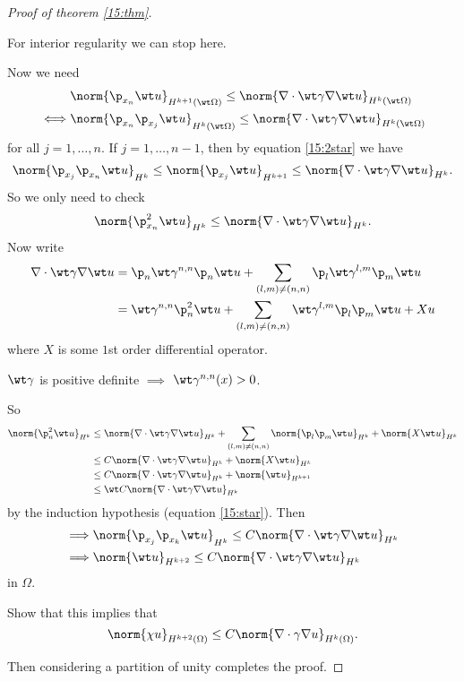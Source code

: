 \begin{proof}[Proof of theorem \ref{15:thm}]
  \begin{rmk}
    For interior regularity we can stop here.
  \end{rmk}

  Now we need
  \begin{align*}
    &\norm{\p_{x_n}\wt u}_{H^{k+1}(\wt\Omega)} \leq \norm{\nabla\cdot\wt\gamma\nabla\wt u}_{H^k(\wt\Omega)} \\
    \iff &\norm{\p_{x_n}\p_{x_j}\wt u}_{H^k(\wt\Omega)} \leq \norm{\nabla\cdot\wt\gamma\nabla\wt u}_{H^k(\wt\Omega)}
  \end{align*}
  for all $j=1,\ldots,n$.
  If $j=1,\ldots,n-1$, then by equation \ref{15:2star} we have
  \[ \norm{\p_{x_j}\p_{x_n}\wt u}_{H^k} \leq \norm{\p_{x_j}\wt u}_{H^{k+1}} \leq \norm{\nabla\cdot\wt\gamma\nabla\wt u}_{H^k}. \]
  So we only need to check
  \[ \norm{\p_{x_n}^2\wt u}_{H^k} \leq \norm{\nabla\cdot\wt\gamma\nabla\wt u}_{H^k}. \]
  Now write
  \begin{align*}
    \nabla\cdot\wt\gamma\nabla\wt u &= \p_n \wt\gamma^{n,n} \p_n \wt u + \sum_{(l,m)\neq(n,n)} \p_l \wt\gamma^{l,m} \p_m \wt u \\
    &= \wt\gamma^{n,n} \p_n^2 \wt u + \sum_{(l,m)\neq(n,n)} \wt\gamma^{l,m} \p_l\p_m \wt u + Xu
  \end{align*}
  where $X$ is some $1$st order differential operator.

  \begin{exer}
    $\wt\gamma$ is positive definite $\implies$ $\wt\gamma^{n,n}(x)>0$.
  \end{exer}

  So
  \begin{align*}
    \norm{\p_n^2\wt u}_{H^k} &\leq \norm{\nabla\cdot\wt\gamma\nabla\wt u}_{H^k} + \sum_{(l,m)\neq(n,n)} \norm{\p_l\p_m\wt u}_{H^k} + \norm{X\wt u}_{H^k} \\
    &\leq C\norm{\nabla\cdot\wt\gamma\nabla\wt u}_{H^k} + \norm{X\wt u}_{H^k} \\
    &\leq C\norm{\nabla\cdot\wt\gamma\nabla\wt u}_{H^k} + \norm{\wt u}_{H^{k+1}} \\
    &\leq \wt C\norm{\nabla\cdot\wt\gamma\nabla\wt u}_{H^k}
  \end{align*}
  by the induction hypothesis (equation \ref{15:star}).
  Then
  \begin{align*}
    \implies &\norm{\p_{x_j}\p_{x_k}\wt u}_{H^k} \leq C\norm{\nabla\cdot\wt\gamma\nabla\wt u}_{H^k} \\
    \implies &\norm{\wt u}_{H^{k+2}} \leq C\norm{\nabla\cdot\wt\gamma\nabla\wt u}_{H^k}
  \end{align*}
  in $\Omega$.

  \begin{exer}
    Show that this implies that
    \[ \norm{\chi u}_{H^{k+2}(\Omega)} \leq C\norm{\nabla\cdot\gamma\nabla u}_{H^k(\Omega)}. \]
  \end{exer}

  Then considering a partition of unity completes the proof.
\end{proof}

